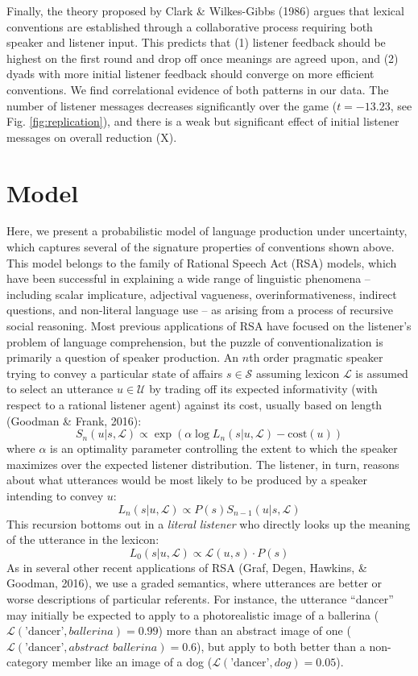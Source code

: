 \documentclass[10pt, letterpaper]{article}
\begin{document}
Finally, the theory proposed by Clark \& Wilkes-Gibbs (1986) argues that
lexical conventions are established through a collaborative process
requiring both speaker and listener input. This predicts that (1)
listener feedback should be highest on the first round and drop off once
meanings are agreed upon, and (2) dyads with more initial listener
feedback should converge on more efficient conventions. We find
correlational evidence of both patterns in our data. The number of
listener messages decreases significantly over the game (\(t = -13.23\),
see Fig. \ref{fig:replication}), and there is a weak but significant
effect of initial listener messages on overall reduction (X).

\section{Model}\label{model}

Here, we present a probabilistic model of language production under
uncertainty, which captures several of the signature properties of
conventions shown above. This model belongs to the family of Rational
Speech Act (RSA) models, which have been successful in explaining a wide
range of linguistic phenomena -- including scalar implicature,
adjectival vagueness, overinformativeness, indirect questions, and
non-literal language use -- as arising from a process of recursive
social reasoning. Most previous applications of RSA have focused on the
listener's problem of language comprehension, but the puzzle of
conventionalization is primarily a question of speaker production. An
\(n\)th order pragmatic speaker trying to convey a particular state of
affairs \(s \in \mathcal{S}\) assuming lexicon \(\mathcal{L}\) is
assumed to select an utterance \(u \in \mathcal{U}\) by trading off its
expected informativity (with respect to a rational listener agent)
against its cost, usually based on length (Goodman \& Frank, 2016):
\[S_n(u | s, \mathcal{L}) \propto \exp{\left(\alpha \log L_n(s | u, \mathcal{L}) - \textrm{cost}(u)\right)}\]
where \(\alpha\) is an optimality parameter controlling the extent to
which the speaker maximizes over the expected listener distribution. The
listener, in turn, reasons about what utterances would be most likely to
be produced by a speaker intending to convey \(u\):
\[L_n(s | u, \mathcal{L}) \propto P(s) S_{n-1}(u | s, \mathcal{L})\]
\indent This recursion bottoms out in a \emph{literal listener} who
directly looks up the meaning of the utterance in the lexicon:
\[L_0(s | u, \mathcal{L}) \propto \mathcal{L}(u, s)\cdot P(s)\]
\indent As in several other recent applications of RSA (Graf, Degen,
Hawkins, \& Goodman, 2016), we use a graded semantics, where utterances
are better or worse descriptions of particular referents. For instance,
the utterance ``dancer'' may initially be expected to apply to a
photorealistic image of a ballerina
(\(\mathcal{L}(\textrm{'dancer'}, \textit{ballerina}) = 0.99\)) more
than an abstract image of one
(\(\mathcal{L}(\textrm{'dancer'}, \textit{abstract ballerina}) =0.6\)),
but apply to both better than a non-category member like an image of a
dog (\(\mathcal{L}(\textrm{'dancer'}, \textit{dog}) = 0.05\)).
\end{document}
